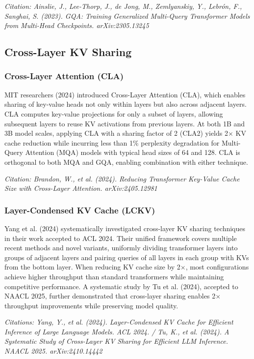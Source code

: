 \documentclass[11pt,letterpaper]{article}
\begin{document}
\textit{Citation: Ainslie, J., Lee-Thorp, J., de Jong, M., Zemlyanskiy, Y., Lebrón, F., Sanghai, S. (2023). GQA: Training Generalized Multi-Query Transformer Models from Multi-Head Checkpoints. arXiv:2305.13245}

\subsection{Cross-Layer KV Sharing}

\subsubsection{Cross-Layer Attention (CLA)}

MIT researchers (2024) introduced Cross-Layer Attention (CLA), which enables sharing of key-value heads not only within layers but also across adjacent layers. CLA computes key-value projections for only a subset of layers, allowing subsequent layers to reuse KV activations from previous layers. At both 1B and 3B model scales, applying CLA with a sharing factor of 2 (CLA2) yields 2$\times$ KV cache reduction while incurring less than 1\% perplexity degradation for Multi-Query Attention (MQA) models with typical head sizes of 64 and 128. CLA is orthogonal to both MQA and GQA, enabling combination with either technique.

\textit{Citation: Brandon, W., et al. (2024). Reducing Transformer Key-Value Cache Size with Cross-Layer Attention. arXiv:2405.12981}

\subsubsection{Layer-Condensed KV Cache (LCKV)}

Yang et al. (2024) systematically investigated cross-layer KV sharing techniques in their work accepted to ACL 2024. Their unified framework covers multiple recent methods and novel variants, uniformly dividing transformer layers into groups of adjacent layers and pairing queries of all layers in each group with KVs from the bottom layer. When reducing KV cache size by 2$\times$, most configurations achieve higher throughput than standard transformers while maintaining competitive performance. A systematic study by Tu et al. (2024), accepted to NAACL 2025, further demonstrated that cross-layer sharing enables 2$\times$ throughput improvements while preserving model quality.

\textit{Citations: Yang, Y., et al. (2024). Layer-Condensed KV Cache for Efficient Inference of Large Language Models. ACL 2024. / Tu, K., et al. (2024). A Systematic Study of Cross-Layer KV Sharing for Efficient LLM Inference. NAACL 2025. arXiv:2410.14442}
\end{document}
